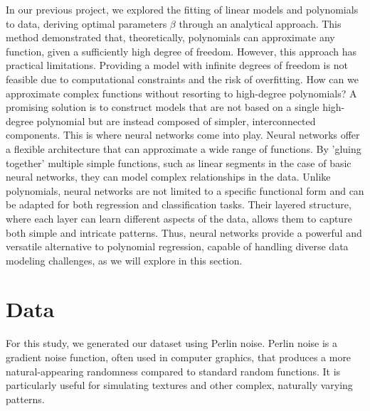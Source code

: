 \documentclass[twoside,11pt]{report}
\begin{document}
    In our previous project\cite{MachineLearningProjects_2023}, we explored the fitting of linear models and 
    polynomials to data, deriving optimal parameters \(\beta\) through an analytical approach. 
    This method demonstrated that, theoretically, polynomials can approximate any function, given a sufficiently 
    high degree of freedom. However, this approach has practical limitations. 
    Providing a model with infinite degrees of freedom is not feasible due to computational constraints 
    and the risk of overfitting. How can we approximate complex functions without resorting to high-degree 
    polynomials? A promising solution is to construct models that are not based on a single high-degree polynomial 
    but are instead composed of simpler, interconnected components. This is where neural networks come into play.
    Neural networks offer a flexible architecture that can approximate a wide range of functions. By 'gluing together' 
    multiple simple functions, such as linear segments in the case of basic neural networks, they can model complex 
    relationships in the data. Unlike polynomials, neural networks are not limited to a specific functional form and 
    can be adapted for both regression and classification tasks. Their layered structure, where each layer can learn 
    different aspects of the data, allows them to capture both simple and intricate patterns.
    Thus, neural networks provide a powerful and versatile alternative to polynomial regression, capable of handling 
    diverse data modeling challenges, as we will explore in this section.




\section*{Data}

    For this study, we generated our dataset using Perlin noise. Perlin noise is a gradient noise function, 
    often used in computer graphics, that produces a more natural-appearing randomness compared to standard 
    random functions. It is particularly useful for simulating textures and other complex, naturally varying patterns.
\end{document}
